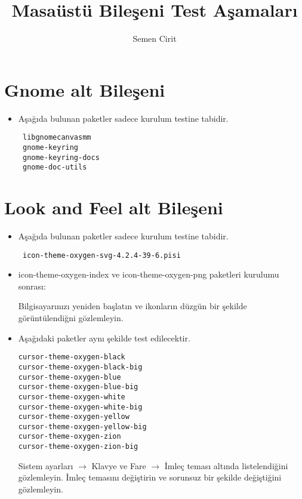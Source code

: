 \documentclass[a4paper,10pt]{article}
\title{Masaüstü Bileşeni Test Aşamaları}
\author{Semen Cirit}
\begin{document}
\maketitle
\section{Gnome alt Bileşeni}
\begin{itemize}
 \item Aşağıda bulunan paketler sadece kurulum testine tabidir.
\begin{verbatim}
 libgnomecanvasmm
 gnome-keyring
 gnome-keyring-docs
 gnome-doc-utils
\end{verbatim}

\end{itemize}

\section{Look and Feel alt Bileşeni}
\begin{itemize}
\item Aşağıda bulunan paketler sadece kurulum testine tabidir.
\begin{verbatim}
 icon-theme-oxygen-svg-4.2.4-39-6.pisi
\end{verbatim}
\item icon-theme-oxygen-index ve icon-theme-oxygen-png paketleri kurulumu sonrası:

Bilgisayarınızı yeniden başlatın ve ikonların düzgün bir şekilde görüntülendiğni gözlemleyin.
 \item Aşağıdaki paketler aynı şekilde test edilecektir.
\begin{verbatim}
cursor-theme-oxygen-black
cursor-theme-oxygen-black-big
cursor-theme-oxygen-blue
cursor-theme-oxygen-blue-big
cursor-theme-oxygen-white
cursor-theme-oxygen-white-big
cursor-theme-oxygen-yellow
cursor-theme-oxygen-yellow-big
cursor-theme-oxygen-zion
cursor-theme-oxygen-zion-big
\end{verbatim}

Sistem ayarları $\rightarrow$  Klavye ve Fare $\rightarrow$ İmleç teması altında listelendiğini gözlemleyin. İmleç temasını değiştirin ve sorunsuz bir şekilde değiştiğini gözlemleyin.

\end{itemize}
\end{document}
